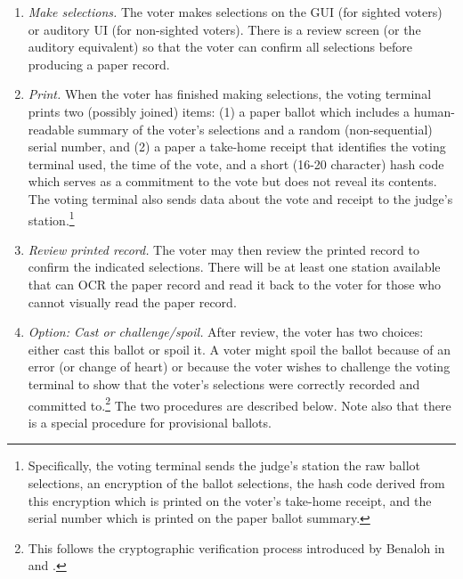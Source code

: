 \begin{enumerate}
\item {\em Make selections.}
 The voter makes selections on the GUI (for sighted voters)
 or auditory UI (for non-sighted voters).
 There is a review screen (or the auditory equivalent)
 so that the voter can confirm all selections before producing a paper record.

\item {\em Print.} When the voter has finished making selections,
  the voting terminal prints two (possibly joined) items:
  (1) a paper ballot which includes a human-readable summary of the voter's selections
  and a random (non-sequential) serial number, and
  (2) a paper a take-home receipt that identifies the voting terminal used, the
  time of the vote, and a short (16-20 character) hash code which
  serves as a commitment to the vote but does not reveal its contents.
  The voting terminal also sends data about the vote and receipt
  to the judge's station.\footnote{
  Specifically, the voting terminal sends the judge's station
  the raw ballot selections, an encryption of the ballot selections,
  the hash code derived from this encryption
  which is printed on the voter's take-home receipt,
  and the serial number which is printed on the paper ballot summary.} 


 
% 

\item {\em Review printed record.}
The voter may then review the printed record to confirm the indicated selections. There will be at least one station available that can OCR the paper record and read it back to the voter for those who cannot visually read the paper record.

\item {\em Option: Cast or challenge/spoil.}
After review, the voter has two choices: either cast this ballot or spoil it.
 A voter might spoil the ballot because of an error (or change of heart)
 or because the voter wishes to challenge the voting terminal to show
 that the voter's selections were correctly recorded and committed to.\footnote{
 This follows the cryptographic verification process introduced by Benaloh
 in \cite{benaloh06simple} and \cite{benaloh07evt}.}
 The two procedures are described below. Note also that there is a special procedure for provisional ballots.


\end{enumerate}
